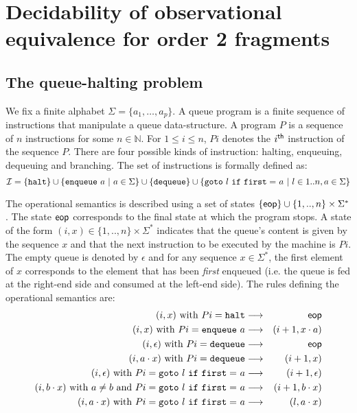 \documentclass{article}
\newcommand{\nat}{\mathbb{N}}
\newcommand\eop{{\sf eop}}
\begin{document}
\section{Decidability of observational equivalence for order 2 fragments}

\subsection{The queue-halting problem}
We fix a finite alphabet $\Sigma = \{ a_1, \ldots, a_p \}$. A queue program is a finite sequence of instructions that manipulate a queue data-structure.
A program $P$ is a sequence of $n$ instructions for some $n\in \nat$. For $1 \leq i \leq n$, $P i$ denotes the $i^{\sf th}$ instruction of the sequence $P$. There are four possible kinds of instruction: halting, enqueuing, dequeuing and branching. The set of instructions is formally defined as:
$$ \mathcal{I} = \{ {\tt halt} \} \cup
\{ {\tt enqueue \ } a \ | \ a \in \Sigma \}
\cup \{ {\tt dequeue} \} \cup \{ {\tt goto\ } l {\tt\ if\ first =\ } a \ | \ l \in 1..n, a \in \Sigma \}
 $$


The operational semantics is described using a set of states $ \{ \eop \} \cup \{ 1,..,n \} \times \Sigma^* $. The state $\eop$ corresponds to the final state at which the program stops. A state of the form $(i,x) \in \{ 1,..,n \} \times \Sigma^*$ indicates that the queue's content is given by the sequence $x$ and that the next instruction to be executed by the machine is $P i$. The empty queue is denoted by $\epsilon$ and for any sequence $x \in \Sigma^*$, the first element of $x$ corresponds to the element that has been \emph{first} enqueued (i.e. the queue is fed at the right-end side and consumed at the left-end side). The rules defining the operational semantics are:
\begin{eqnarray*}
(i,x) \mbox{ with } P i = {\tt halt} &\longrightarrow& \eop \\
(i,x) \mbox{ with } P i = {\tt enqueue\ } a &\longrightarrow& (i+1,x \cdot a) \\
(i,\epsilon) \mbox{ with } P i = {\tt dequeue } &\longrightarrow& \eop \\
(i,a \cdot x) \mbox{ with } P i = {\tt dequeue } &\longrightarrow& (i+1,x) \\
(i,\epsilon) \mbox{ with } P i =  {\tt goto\ } l {\tt\ if\ first =\ } a &\longrightarrow& (i+1,\epsilon) \\
(i,b \cdot x) \mbox{ with } a \neq b \mbox{ and } P i =  {\tt goto\ } l {\tt\ if\ first =\ } a &\longrightarrow& (i+1,b \cdot x) \\
(i,a \cdot x) \mbox{ with } P i =  {\tt goto\ } l {\tt\ if\ first =\ } a &\longrightarrow& (l,a \cdot x)
\end{eqnarray*}
\end{document}
